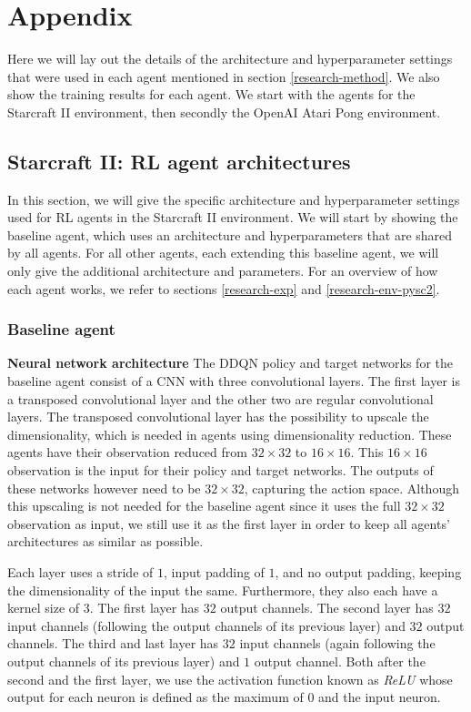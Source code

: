 \chapter{Appendix}\label{appendix}
Here we will lay out the details of the architecture and hyperparameter settings that were used in each agent mentioned in section \ref{research-method}. We also show the training results for each agent. We start with the agents for the Starcraft II environment, then secondly the OpenAI Atari Pong environment.

\section{Starcraft II: RL agent architectures}\label{appendix-agents}
In this section, we will give the specific architecture and hyperparameter settings used for RL agents in the Starcraft II environment. We will start by showing the baseline agent, which uses an architecture and hyperparameters that are shared by all agents. For all other agents, each extending this baseline agent, we will only give the additional architecture and parameters. For an overview of how each agent works, we refer to sections \ref{research-exp} and \ref{research-env-pysc2}.


\subsection{Baseline agent}\label{appendix-baseline}
\textbf{Neural network architecture}\newline
\noindent The DDQN policy and target networks for the baseline agent consist of a CNN with three convolutional layers. The first layer is a transposed convolutional layer \cite{transpose} and the other two are regular convolutional layers. The transposed convolutional layer has the possibility to upscale the dimensionality, which is needed in agents using dimensionality reduction. These agents have their observation reduced from $32 \times 32$ to $16 \times 16$. This $16 \times 16$ observation is the input for their policy and target networks. The outputs of these networks however need to be $32 \times 32$, capturing the action space. Although this upscaling is not needed for the baseline agent since it uses the full $32 \times 32$ observation as input, we still use it as the first layer in order to keep all agents' architectures as similar as possible.

Each layer uses a stride of $1$, input padding of $1$, and no output padding, keeping the dimensionality of the input the same. Furthermore, they also each have a kernel size of $3$. The first layer has $32$ output channels. The second layer has $32$ input channels (following the output channels of its previous layer) and $32$ output channels. The third and last layer has $32$ input channels (again following the output channels of its previous layer) and $1$ output channel. Both after the second and the first layer, we use the activation function known as \emph{ReLU} \cite{relu} whose output for each neuron is defined as the maximum of $0$ and the input neuron.

